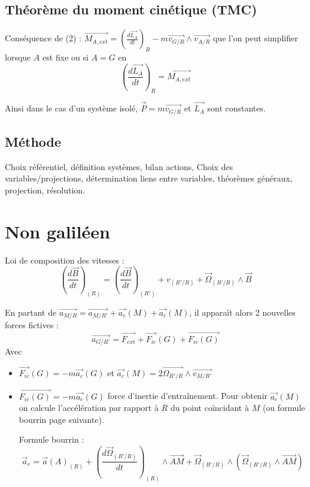 \documentclass[9pt]{article}
\begin{document}
\begin{multicols*}{2}
\subsection{Théorème du moment cinétique (TMC)}
Conséquence de (2) : $\overrightarrow{M_{A,ext}} = \left(\frac{d\overrightarrow{L_A}}{dt}\right)_R - m\overrightarrow{v_{G/R}}\wedge\overrightarrow{v_{A/R}}$ que l'on peut simplifier lorsque $A$ est fixe ou si $A=G$ en 
$$\boxed{ \left(\frac{d\overrightarrow{L_A}}{dt}\right)_R = \overrightarrow{M_{A,ext}}}$$

Ainsi dans le cas d'un système isolé, $\overrightarrow{P}=m\overrightarrow{v_{G/R}}$ et $\overrightarrow{L_A}$ sont constantes.
\subsection{Méthode}
Choix référentiel, définition systèmes, bilan actions, Choix des variables/projections, détermination liens entre variables, théorèmes généraux, projection, résolution.

\section{Non galiléen}
Loi de composition des vitesses : 
$$\boxed{\left( \frac{d\vec{B}}{dt} \right )_{(R)}=\left ( \frac{d\vec{B}}{dt}  \right )_{(R')} + v_{(R'/R)} + \vec{\Omega}_{(R'/R)}\wedge \vec{B}}$$

En partant de $\overrightarrow{a_{M/R}} = \overrightarrow{a_{M/R'}} + \overrightarrow{a_{e}}(M) + \overrightarrow{a_c}(M)$, il apparaît alors 2 nouvelles forces fictives :
$$\boxed{\overrightarrow{a_{G/R'}} = \overrightarrow{F_{ext}} + \overrightarrow{F_{ie}}(G) + \overrightarrow{F_{ic}(G)}}$$
Avec
\begin{itemize}
\item $\overrightarrow{F_{ic}}(G) = -m\overrightarrow{a_c}(G)$ et $\overrightarrow{a_c}(M) = 2\overrightarrow{\Omega_{R'/R}}\wedge\overrightarrow{v_{M/R'}}$
\item $\overrightarrow{F_{ie}(G)} = -m\overrightarrow{a_e}(G)$ force d'inertie d'entraînement. Pour obtenir $\overrightarrow{a_e}(M)$ on calcule l'accélération par rapport à $R$ du point coïncidant à $M$ (ou formule bourrin page suivante).

Formule bourrin : $$\vec{a}_e=\vec{a}(A)_{(R)}+\left ( \frac{d\vec{\Omega}_{(R'/R)}}{dt} \right )_{(R)}\wedge \vec{AM}+\vec{\Omega}_{(R'/R)}\wedge(\vec{\Omega}_{(R'/R)}\wedge\vec{AM})$$
\end{itemize}


\end{multicols*}
\end{document}

